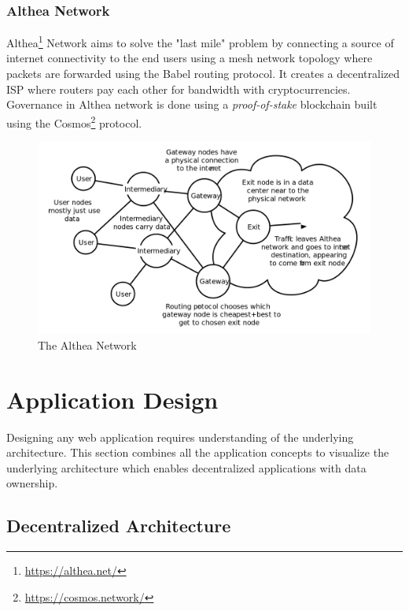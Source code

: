 		\subsubsection{Althea Network}
		Althea\footnote{\url{https://althea.net/}} Network aims to solve the "last mile" problem by connecting a source of internet connectivity to the end users using a mesh network topology where packets are forwarded using the Babel routing protocol\cite{chroboczek2011babel}. It creates a decentralized ISP where routers pay each other for bandwidth with cryptocurrencies. Governance in Althea network is done using a \textit{proof-of-stake} blockchain built using the Cosmos\footnote{\url{https://cosmos.network/}} protocol.
		
		\begin{figure}[h]
			\includegraphics[width=\linewidth]{figures/althea-network}
			\caption{\label{fig:althea-network} The Althea Network\protect\footnotemark}
		\end{figure}
	
\section{Application Design}
	Designing any web application requires understanding of the underlying architecture. This section combines all the application concepts to visualize the underlying architecture which enables decentralized applications with data ownership.
	
	\subsection{Decentralized Architecture}
	